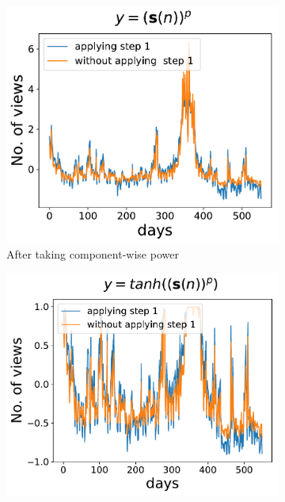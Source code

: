   \begin{figure}[h]
      \begin{subfigure}[h]{0.5\textwidth}
          \includegraphics[width=\textwidth]{./description/images/compare_squeezed}
          \caption{ After taking component-wise power}
          \label{fig:compare_squeezed}
      \end{subfigure}
      \begin{subfigure}[h]{0.5\textwidth}
          \includegraphics[width=\textwidth]{./description/images/compare_tanh}

\end{subfigure}
\end{figure}
